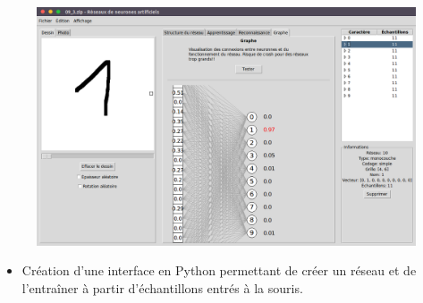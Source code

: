 \clearpage
{}

\begin{slide}

	\begin{figure}[h]
		\centering
		\includegraphics[width=\linewidth]{schemas/capture.png}
	\end{figure}

	\begin{itemize}
		\item Création d'une interface en Python permettant de créer un réseau et de l'entraîner à partir d'échantillons entrés à la souris.
	\end{itemize}

\end{slide}